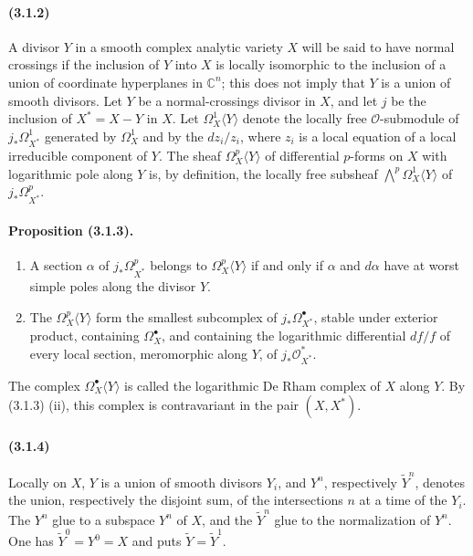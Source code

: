 \documentclass[10pt]{article}
\newcommand{\C}{\mathbb C}
\providecommand{\cO}{\mathcal O}
\providecommand{\cO}{\mathcal O}
\begin{document}
\paragraph{(3.1.2)} A divisor $Y$ in a smooth complex analytic variety $X$ will be said to have normal crossings if the inclusion of $Y$ into $X$ is locally isomorphic to the inclusion of a union of coordinate hyperplanes in $\C^n$; this does not imply that $Y$ is a union of smooth divisors. Let $Y$ be a normal-crossings divisor in $X$, and let $j$ be the inclusion of $X^*=X-Y$ in $X$. Let $\Omega_X^1\langle Y\rangle$ denote the locally free $\cO$-submodule of $j_*\Omega_{X^*}^1$ generated by $\Omega_X^1$ and by the $dz_i/z_i$, where $z_i$ is a local equation of a local irreducible component of $Y$. The sheaf $\Omega_X^p\langle Y\rangle$ of differential $p$-forms on $X$ with logarithmic pole along $Y$ is, by definition, the locally free subsheaf $\bigwedge^p\Omega_X^1\langle Y\rangle$ of $j_*\Omega_{X^*}^p$.

\paragraph{Proposition (3.1.3).}
\begin{enumerate}[label=(\roman*)]
\item A section $\alpha$ of $j_*\Omega_{X^*}^p$ belongs to $\Omega_X^p\langle Y\rangle$ if and only if $\alpha$ and $d\alpha$ have at worst simple poles along the divisor $Y$.
\item The $\Omega_X^p\langle Y\rangle$ form the smallest subcomplex of $j_*\Omega_{X^*}^\bullet$, stable under exterior product, containing $\Omega_X^\bullet$, and containing the logarithmic differential $df/f$ of every local section, meromorphic along $Y$, of $j_*\cO_{X^*}^*$.
\end{enumerate}
The complex $\Omega_X^\bullet\langle Y\rangle$ is called the logarithmic De Rham complex of $X$ along $Y$. By (3.1.3) (ii), this complex is contravariant in the pair $(X,X^*)$.

\paragraph{(3.1.4)} Locally on $X$, $Y$ is a union of smooth divisors $Y_i$, and $Y^n$, respectively $\widetilde Y^n$, denotes the union, respectively the disjoint sum, of the intersections $n$ at a time of the $Y_i$. The $Y^n$ glue to a subspace $Y^n$ of $X$, and the $\widetilde Y^n$ glue to the normalization of $Y^n$. One has $\widetilde Y^0=Y^0=X$ and puts $\widetilde Y=\widetilde Y^1$.
\end{document}
